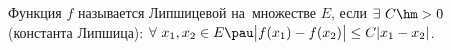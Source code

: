 
    Функция $f$ называется Липшицевой на~множестве $E$, если $\exists\  C\hm>0$ (константа Липшица): $\forall\  x_1,x_2\in E\pau
    \big|f(x_1)-f(x_2)\big|\leq C|x_1-x_2|$.

